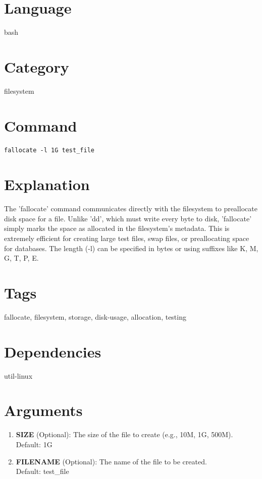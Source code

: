 \documentclass[openany]{book}
\begin{document}
\section*{Language}
bash

\section*{Category}
filesystem

\section*{Command}
\begin{lstlisting}
fallocate -l 1G test_file
\end{lstlisting}

\section*{Explanation}
The 'fallocate' command communicates directly with the filesystem to preallocate disk space for a file. Unlike 'dd', which must write every byte to disk, 'fallocate' simply marks the space as allocated in the filesystem's metadata. This is extremely efficient for creating large test files, swap files, or preallocating space for databases. The length (-l) can be specified in bytes or using suffixes like K, M, G, T, P, E.

\section*{Tags}
fallocate, filesystem, storage, disk-usage, allocation, testing

\section*{Dependencies}
util-linux


\section*{Arguments}
\begin{enumerate}
  \item \textbf{SIZE} (Optional): The size of the file to create (e.g., 10M, 1G, 500M). \\ Default: 1G
  \item \textbf{FILENAME} (Optional): The name of the file to be created. \\ Default: test\_file
\end{enumerate}
\end{document}
